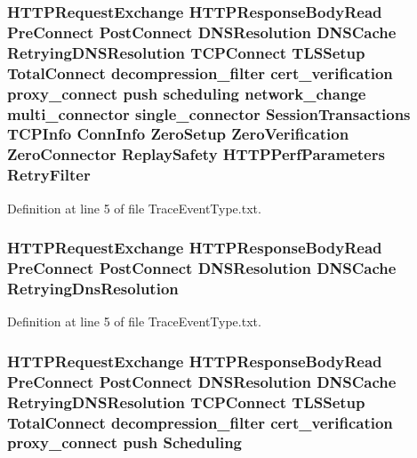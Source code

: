 \subsubsection[{Retry\+Filter}]{ H\+T\+T\+P\+Request\+Exchange H\+T\+T\+P\+Response\+Body\+Read {\bf Pre\+Connect} {\bf Post\+Connect} D\+N\+S\+Resolution D\+N\+S\+Cache Retrying\+D\+N\+S\+Resolution T\+C\+P\+Connect T\+L\+S\+Setup {\bf Total\+Connect} decompression\+\_\+filter cert\+\_\+verification proxy\+\_\+connect push scheduling network\+\_\+change multi\+\_\+connector single\+\_\+connector {\bf Session\+Transactions} {\bf T\+C\+P\+Info} {\bf Conn\+Info} {\bf Zero\+Setup} {\bf Zero\+Verification} {\bf Zero\+Connector} {\bf Replay\+Safety} {\bf H\+T\+T\+P\+Perf\+Parameters} Retry\+Filter}\label{TraceEventType_8txt_a712b7cded851ab4dd752d4f5bfd96fda}


Definition at line 5 of file Trace\+Event\+Type.\+txt.

\subsubsection[{Retrying\+Dns\+Resolution}]{ H\+T\+T\+P\+Request\+Exchange H\+T\+T\+P\+Response\+Body\+Read {\bf Pre\+Connect} {\bf Post\+Connect} D\+N\+S\+Resolution D\+N\+S\+Cache Retrying\+Dns\+Resolution}\label{TraceEventType_8txt_aa2fad37dcf94bd304465601a71a1080d}


Definition at line 5 of file Trace\+Event\+Type.\+txt.

\subsubsection[{Scheduling}]{ H\+T\+T\+P\+Request\+Exchange H\+T\+T\+P\+Response\+Body\+Read {\bf Pre\+Connect} {\bf Post\+Connect} D\+N\+S\+Resolution D\+N\+S\+Cache Retrying\+D\+N\+S\+Resolution T\+C\+P\+Connect T\+L\+S\+Setup {\bf Total\+Connect} decompression\+\_\+filter cert\+\_\+verification proxy\+\_\+connect push Scheduling}\label{TraceEventType_8txt_ab63dd55f8e60fa5319547bbc77b12286}


